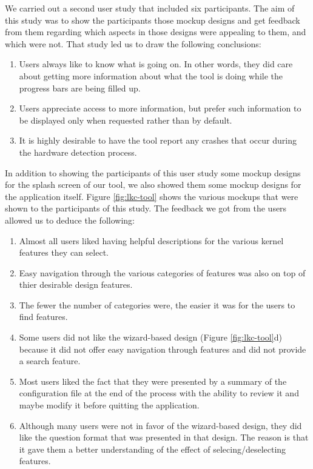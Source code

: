 \documentclass{chi2009}
\begin{document}
We carried out a second user study that included six participants. The aim of this study was to show the participants those mockup designs and get feedback from
them regarding which aspects in those designs were appealing to them, and which were not. That study led us to draw the following conclusions:
\begin{enumerate}
 \item Users always like to know what is going on. In other words, they did care about getting more information about what the tool is doing while the progress
bars are being filled up.
 \item Users appreciate access to more information, but prefer such information to be displayed only when requested rather than by default.
 \item It is highly desirable to have the tool report any crashes that occur during the hardware detection process.
\end{enumerate}

In addition to showing the participants of this user study some mockup designs for the splash screen of our tool, we also showed them some mockup designs
for the application itself. Figure \ref{fig:lkc-tool} shows the various mockups that were shown to the participants of this study. The feedback we got from the
users allowed us to deduce the following:
\begin{enumerate}
 \item Almost all users liked having helpful descriptions for the various kernel features they can select.
 \item Easy navigation through the various categories of features was also on top of thier desirable design features.
 \item The fewer the number of categories were, the easier it was for the users to find features.
 \item Some users did not like the wizard-based design (Figure \ref{fig:lkc-tool}d) because it did not offer easy navigation through features and did not
provide a search feature.
 \item Most users liked the fact that they were presented by a summary of the configuration file at the end of the process with the ability to review it and
maybe modify it before quitting the application.
 \item Although many users were not in favor of the wizard-based design, they did like the question format that was presented in that design. The reason is
that it gave them a better understanding of the effect of selecing/deselecting features.
\end{enumerate}
\end{document}
